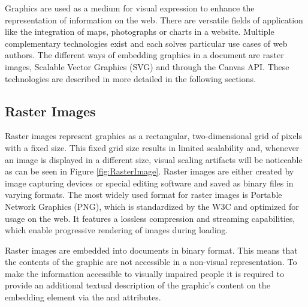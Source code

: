 Graphics are used as a medium for visual expression to enhance the representation of information on the web. There are versatile fields of application like the integration of maps, photographs or charts in a website. Multiple complementary technologies exist and each solves particular use cases of web authors. The different ways of embedding graphics in a document are raster images, Scalable Vector Graphics (SVG) and through the Canvas API. These technologies are described in more detailed in the following sections.

\subsection{Raster Images}

Raster images represent graphics as a rectangular, two-dimensional grid of pixels with a fixed size. This fixed grid size results in limited scalability and, whenever an image is displayed in a different size, visual scaling artifacts will be noticeable as can be seen in Figure \ref{fig:RasterImage}. Raster images are either created by image capturing devices or special editing software and saved as binary files in varying formats. The most widely used format for raster images is Portable Network Graphics (PNG), which is standardized by the W3C \parencite{PNG} and optimized for usage on the web. It features a lossless compression and streaming capabilities, which enable progressive rendering of images during loading.

Raster images are embedded into documents in binary format. This means that the contents of the graphic are not accessible in a non-visual representation. To make the information accessible to visually impaired people it is required to provide an additional textual description of the graphic's content on the embedding element via the  and  attributes.

